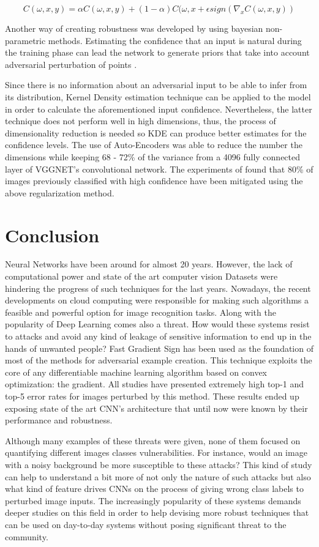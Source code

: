 \documentclass{article}
\begin{document}
$$ C(\omega,x,y) = \alpha C(\omega ,x,y) + (1-\alpha )C(\omega ,x+\epsilon sign(\nabla_{x}C(\omega,x,y))$$

Another way of creating robustness was developed by using bayesian non-parametric methods. Estimating the confidence that an input is natural during the training phase can lead the network to generate priors that take into account adversarial perturbation of points \cite{billovits}. 

Since there is no information about an adversarial input to be able to infer from its distribution, Kernel Density estimation technique can be applied to the model in order to calculate the aforementioned input confidence. Nevertheless, the latter technique does not perform well in high dimensions, thus, the process of dimensionality reduction is needed so KDE can produce better estimates for the confidence levels. The use of Auto-Encoders was able to reduce the number the dimensions while keeping 68 - 72\% of the variance from a 4096 fully connected layer of VGGNET's \cite{simonyan2014very} convolutional network. The experiments of \cite{billovits} found that 80\% of images previously classified with high confidence have been mitigated using the above regularization method.
\section{Conclusion}\label{sec:conclusion}

Neural Networks have been around for almost 20 years. However, the lack of computational power and state of the art computer vision Datasets were hindering the progress of such techniques for the last years. Nowadays, the recent developments on cloud computing were responsible for making such algorithms a feasible and powerful option for image recognition tasks. Along with the popularity of Deep Learning comes also a threat. How would these systems resist to attacks and avoid any kind of leakage of sensitive information to end up in the hands of unwanted people? Fast Gradient Sign has been used as the foundation of most of the methods for adversarial example creation. This technique exploits the core of any differentiable machine learning algorithm based on convex optimization: the gradient. All studies have presented extremely high top-1 and top-5 error rates for images perturbed by this method. These results ended up exposing state of the art CNN's architecture that until now were known by their performance and robustness.

Although many examples of these threats were given, none of them focused on quantifying different images classes vulnerabilities. For instance, would an image with a noisy background be more susceptible to these attacks? This kind of study can help to understand a bit more of not only the nature of such attacks but also what kind of feature drives CNNs on the process of giving wrong class labels to perturbed image inputs. The increasingly popularity of these systems demands deeper studies on this field in order to help devising more robust techniques that can be used on day-to-day systems without posing significant threat to the community.


\pagebreak


\end{document}
